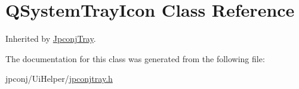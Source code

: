 \hypertarget{class_q_system_tray_icon}{}\section{Q\+System\+Tray\+Icon Class Reference}
\label{class_q_system_tray_icon}


Inherited by \hyperlink{class_jpconj_tray}{Jpconj\+Tray}.



The documentation for this class was generated from the following file\+:\begin{DoxyCompactItemize}
\item 
jpconj/\+Ui\+Helper/\hyperlink{jpconjtray_8h}{jpconjtray.\+h}\end{DoxyCompactItemize}
